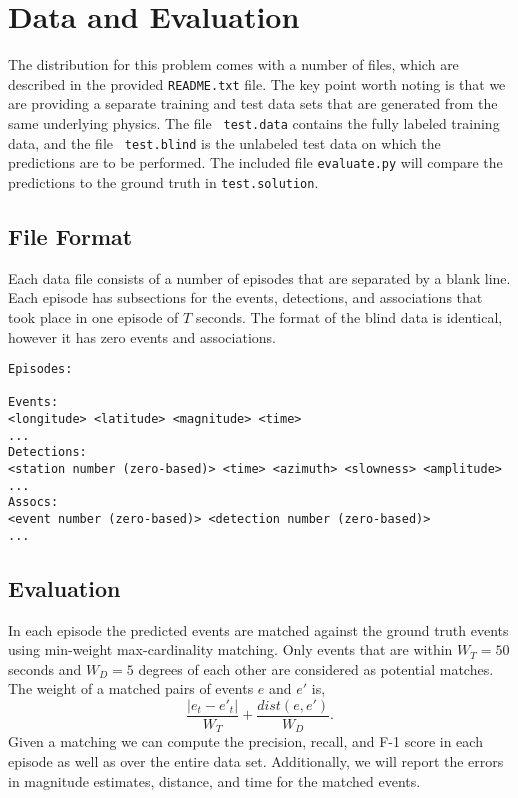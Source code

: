 \documentclass[12pt,letterpaper,onecolumn,oneside]{article}
\begin{document}
\section{Data and Evaluation}

The distribution for this problem comes with a number of files, which
are described in the provided {\tt README.txt} file. The key point worth
noting is that we are providing a separate training and test data sets
that are generated from the same underlying physics. The file {\tt
  test.data} contains the fully labeled training data, and the file {\tt
  test.blind} is the unlabeled test data on which the predictions are to
be performed. The included file {\tt evaluate.py} will compare the
predictions to the ground truth in {\tt test.solution}.

\subsection{File Format}

Each data file consists of a number of episodes that are separated by a
blank line. Each episode has subsections for the events, detections, and
associations that took place in one episode of $T$ seconds.
The format of the blind data is identical, however it has zero events
and associations.

\begin{verbatim}
Episodes:

Events:
<longitude> <latitude> <magnitude> <time>
...
Detections:
<station number (zero-based)> <time> <azimuth> <slowness> <amplitude>
...
Assocs:
<event number (zero-based)> <detection number (zero-based)>
...

\end{verbatim}

\subsection{Evaluation}

In each episode the predicted events are matched against the ground
truth events using min-weight max-cardinality matching. Only events that
are within $W_T=50$ seconds and $W_D=5$ degrees of each other are
considered as potential matches. The weight of a matched pairs of events
$e$ and $e'$ is,
\[\frac{|e_t - e'_t|}{W_T}  + \frac{dist(e,e')}{W_D} . \]
Given a matching we can compute the precision, recall, and F-1 score in
each episode as well as over the entire data set. Additionally, we will
report the errors in magnitude estimates, distance, and time for the
matched events.
\end{document}
